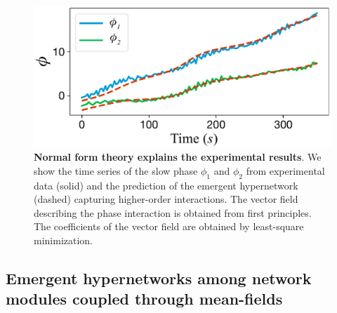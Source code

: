 \documentclass[12pt]{article}
\theoremstyle{plain}
\theoremstyle{definition}
\theoremstyle{remark}
\theoremstyle{remark}
\begin{document}
\begin{figure}[h]
    \centering
    \includegraphics[width=0.7\columnwidth]{Fig3.pdf}
    \caption{{\bf Normal form theory explains the experimental results}. We show the time series of the slow phase $\phi_1$  and $\phi_2$ from experimental data (solid) and the prediction of the emergent hypernetwork (dashed) capturing higher-order interactions. The vector field describing the phase interaction is obtained from first principles. The coefficients of the vector field are obtained by least-square minimization. 
}
    \label{Fig3}
\end{figure}


\subsection*{Emergent hypernetworks among network modules coupled through mean-fields}
\end{document}
